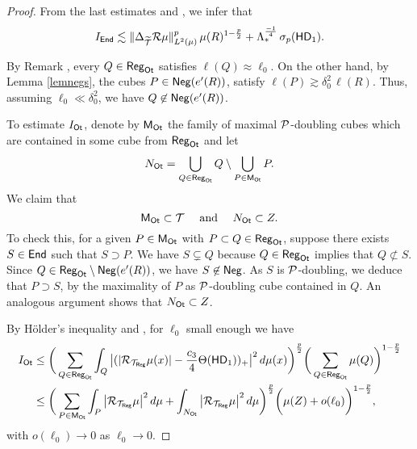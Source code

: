 \begin{proof}
From the last estimates and , we infer that
$$I_{\mathsf{End}} \lesssim
 \|\Delta_{{\widetilde{{\mathcal T}}}}{\mathcal R}\mu\|_{L^2(\mu)}^{p}\,
\mu(R)^{1-\frac{p}2} + \Lambda_*^{\frac{-1}4}\,\sigma_p({\mathsf{HD}}_1).$$

\vv
{} 
By Remark , every $Q\in{\mathsf{Reg}}_{\mathsf{Ot}}$ satisfies $\ell(Q)\approx\ell_0$. On the other hand, by Lemma \ref{lemnegs}, the cubes $P\in{\mathsf{Neg}}(e'(R))$, satisfy $\ell(P) \gtrsim \delta_0^{2}\,\ell(R)$.
Thus, assuming $\ell_0\ll\delta_0^2$, we have $Q\not\in{\mathsf{Neg}}(e'(R))$.

To estimate $I_{{\mathsf{Ot}}}$,
denote by ${\mathsf{M}}_{\mathsf{Ot}}$ the family of maximal ${\mathcal P}$-doubling cubes which are contained in some cube from ${\mathsf{Reg}}_{{\mathsf{Ot}}}$
and let
$$N_{\mathsf{Ot}} = \bigcup_{Q\in {\mathsf{Reg}}_{{\mathsf{Ot}}}} Q\setminus \bigcup_{P\in {\mathsf{M}}_{{\mathsf{Ot}}}} P.$$
We claim that 
\begin{equation}\label{eqinclu827}
{\mathsf{M}}_{\mathsf{Ot}}\subset {\mathcal T}\quad \text{ and }\quad N_{\mathsf{Ot}}\subset Z.
\end{equation}
To check this, for a given $P\in{\mathsf{M}}_{\mathsf{Ot}}$ with $P\subset Q\in{\mathsf{Reg}}_{{\mathsf{Ot}}}$, suppose there exists $S\in{\mathsf{End}}$ such that $S\supset P$. We have $S\subsetneq Q$ because $Q\in{\mathsf{Reg}}_{{\mathsf{Ot}}}$ implies that $Q\not\subset S$. Since $Q\in{\mathsf{Reg}}_{{\mathsf{Ot}}}\setminus {\mathsf{Neg}}(e'(R))$, we  have
$S\not\in {\mathsf{Neg}}$. 
As $S$ is ${\mathcal P}$-doubling, we deduce that $P\supset S$, by the maximality of $P$ as ${\mathcal P}$-doubling cube contained in $Q$. An analogous argument shows that $N_{\mathsf{Ot}}\subset Z$.


By H\"older's inequality and , for $\ell_0$ small enough we have
\begin{align*}
I_{\mathsf{Ot}} &\leq \bigg(\sum_{Q\in{\mathsf{Reg}}_{{\mathsf{Ot}}}} \int_Q \big|(|{\mathcal R}_{{\mathcal T}_{\mathsf{Reg}}}\mu(x)| - 
\frac{c_3}4 \Theta({\mathsf{HD}}_1))_+\big|^{2}\,d\mu(x)\bigg)^{\frac p2} \bigg(\sum_{Q\in{\mathsf{Reg}}_{{\mathsf{Ot}}}}\mu(Q)\bigg)^{1-\frac p2}\\
& \leq
\bigg(\sum_{P\in{\mathsf{M}}_{{\mathsf{Ot}}}} \int_P \big|{\mathcal R}_{{\mathcal T}_{\mathsf{Reg}}}\mu\big|^{2}\,d\mu + \int_{N_{\mathsf{Ot}}} \big|{\mathcal R}_{{\mathcal T}_{\mathsf{Reg}}}\mu\big|^{2}\,d\mu
\bigg)^{\frac p2} \bigg(\mu(Z) + o(\ell_0)\bigg)^{1-\frac p2},
\end{align*}
with $o(\ell_0)\to 0$ as $\ell_0\to0$. 


\end{proof}
